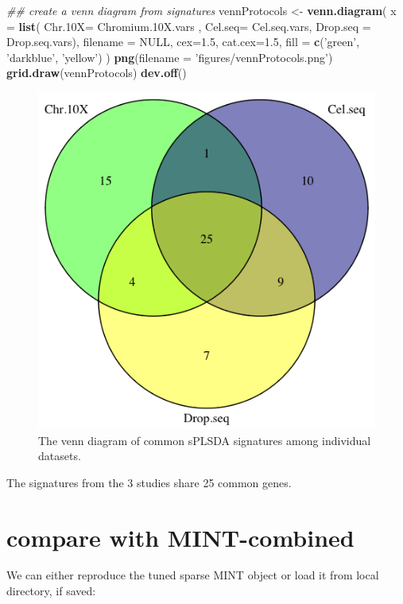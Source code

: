 \documentclass[]{book}
\newenvironment{Shaded}{\begin{snugshade}}{\end{snugshade}}
\newcommand{\CommentTok}[1]{\textcolor[rgb]{0.56,0.35,0.01}{\textit{#1}}}
\newcommand{\DataTypeTok}[1]{\textcolor[rgb]{0.13,0.29,0.53}{#1}}
\newcommand{\FloatTok}[1]{\textcolor[rgb]{0.00,0.00,0.81}{#1}}
\newcommand{\KeywordTok}[1]{\textcolor[rgb]{0.13,0.29,0.53}{\textbf{#1}}}
\newcommand{\NormalTok}[1]{#1}
\newcommand{\OtherTok}[1]{\textcolor[rgb]{0.56,0.35,0.01}{#1}}
\newcommand{\StringTok}[1]{\textcolor[rgb]{0.31,0.60,0.02}{#1}}
\theoremstyle{definition}
\theoremstyle{definition}
\theoremstyle{definition}
\theoremstyle{remark}
\begin{document}
\begin{Shaded}
\begin{Highlighting}[]
\CommentTok{## create a venn diagram from signatures}
\NormalTok{vennProtocols <-}\StringTok{ }\KeywordTok{venn.diagram}\NormalTok{(}
    \DataTypeTok{x =} \KeywordTok{list}\NormalTok{(}
        \DataTypeTok{Chr.10X=}\NormalTok{ Chromium}\FloatTok{.10}\NormalTok{X.vars ,}
        \DataTypeTok{Cel.seq=}\NormalTok{ Cel.seq.vars,}
        \DataTypeTok{Drop.seq =}\NormalTok{ Drop.seq.vars),}
    \DataTypeTok{filename =} \OtherTok{NULL}\NormalTok{,}
    \DataTypeTok{cex=}\FloatTok{1.5}\NormalTok{, }\DataTypeTok{cat.cex=}\FloatTok{1.5}\NormalTok{,}
    \DataTypeTok{fill =} \KeywordTok{c}\NormalTok{(}\StringTok{'green'}\NormalTok{, }\StringTok{'darkblue'}\NormalTok{,  }\StringTok{'yellow'}\NormalTok{)}
\NormalTok{    )}
\KeywordTok{png}\NormalTok{(}\DataTypeTok{filename =} \StringTok{'figures/vennProtocols.png'}\NormalTok{)}
\KeywordTok{grid.draw}\NormalTok{(vennProtocols)}
\KeywordTok{dev.off}\NormalTok{()}
\end{Highlighting}
\end{Shaded}

\begin{figure}[ht]

{\centering \includegraphics[width=0.35\linewidth]{figures/vennProtocols} 

}

\caption{ The venn diagram of common sPLSDA signatures among individual datasets.}\label{fig:unnamed-chunk-19}
\end{figure}

The signatures from the 3 studies share 25 common genes.

\hypertarget{compare-with-mint-combined}{%
\section{compare with MINT-combined}\label{compare-with-mint-combined}}

We can either reproduce the tuned sparse MINT object or load it from
local directory, if saved:
\end{document}
